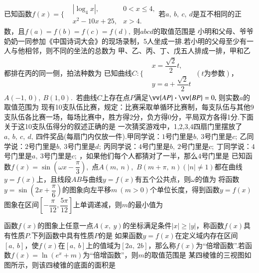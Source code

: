 \documentclass{BHCexam}
\newcommand{\xl}[2]{\vv{#1}\bm\cdot\vv{#2}}
\begin{document}
\begin{questions}
\qs 已知函数$f(x)=\Bigg\{\begin{aligned}
&\left|\log_4x\right|,&0<x\le 4,\\&x^2-10x+25,&x>4.
\end{aligned}$若$ a,~b,~c,~d $是互不相同的正数，且$ f(a)=f(b)=f(c)=f(d),~ $则$ abcd $的取值范围是\xx
{}
\qs 小明和父母、爷爷奶奶一同参加《中国诗词大会》的现场录制，5人坐成一排.若小明的父母至少有一人与他相邻，则不同的坐法的总数为\xx
{}
\qs 甲、乙、丙、丁、戊五人排成一排，甲和乙都排在丙的同一侧，拍法种数为\xx
{}
\qs 已知曲线$ C:\Bigg\{\begin{aligned}
&x=\dfrac{\sqrt{2}}{2}t,\\
&y=a+\dfrac{\sqrt{2}}{2}t
\end{aligned} ~(t\text{为参数})$，$ A(-1,~0),~B(1,0) $.~若曲线$ C $上存在点$ P $满足$ \xl{AP}{BP}=0,~$则实数$ a $的取值范围为\xx
{}
\qs 现有10支队伍比赛，规定：比赛采取单循环比赛制，每支队伍与其他9支队伍各比赛一场，每场比赛中，胜方得2分，负方得0分，平局双方各得1分.下面关于这10支队伍得分的叙述正确的是\xx
{} 
\qs 一次猜奖游戏中，1,2,3,4四扇门里摆放了$ a,~b,~c,~d,~ $四件奖品(每扇门内仅放一件).甲同学说：$1$号门里是$ b,~ $$3$号门里是$ c;~ $乙同学说：$2$号门里是$ b,~ $$3$号门里是$ d;~ $丙同学说：$4$号门里是$ b,~ $$2$号门里是$ c;~ $丁同学说：$4$号门里是$ a,~ $$3$号门里是$ c;~ $，如果他们每个人都猜对了一半，那么$4$号门里是\xx
{}
\qs 已知函数$f(x)=\sin (\omega x-\dfrac{\pi}{3})$,~点$ A(m,~n) $,~$ B(m+\pi,~n) (\left|n\right|\ne 1)$都在曲线$ y=f(x) $上，且线段$ AB $与曲线$ y=f(x) $有五个公共点，则$ \omega $的值为\xx
{}
\qs 将函数$ y=\sin (2x+\dfrac{\pi}{6}) $的图象向左平移$ m~(m>0) $个单位长度，得到函数$ y=f(x) $图象在区间$ \left[-\dfrac{\pi}{12},\dfrac{5\pi}{12}\right] $上单调递减，则$ m $的最小值为\xx
{}


\qs 函数$f(x)$的图象上任意一点$ A(x,~y) $的坐标满足条件$ \left|x\right|\ge\left|y\right| $，称函数$f(x)$具有性质$ P $.下列函数中具有性质$ P $的是\xx
{}
\qs 如果函数$y=f(x)$在定义域内存在区间$ \left[a,~b\right] $，使$f(x)$在$ \left[a,~b\right] $上的值域为$ \left[2a,~2b\right] $，那么称$f(x)$为“倍增函数”.若函数$ f(x)=\ln (e^x+m) $为“倍增函数”，则$ m $的取值范围是\xx
{}
\newpage
\qs 某四棱锥的三视图如图所示，则该四棱锥的底面的面积是\xx
\begin{center}
\end{center}
\end{questions}
\end{document}
